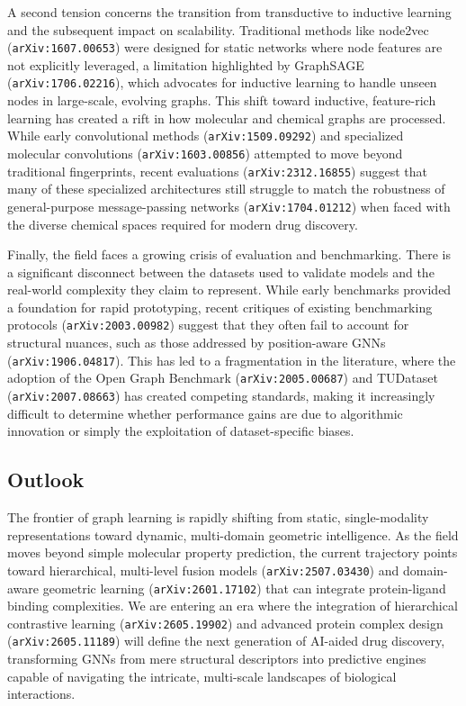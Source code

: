 \documentclass[11pt]{article}
\begin{document}
A second tension concerns the transition from transductive to inductive learning and the subsequent impact on scalability. Traditional methods like node2vec (\texttt{arXiv:1607.00653}) were designed for static networks where node features are not explicitly leveraged, a limitation highlighted by GraphSAGE (\texttt{arXiv:1706.02216}), which advocates for inductive learning to handle unseen nodes in large-scale, evolving graphs. This shift toward inductive, feature-rich learning has created a rift in how molecular and chemical graphs are processed. While early convolutional methods (\texttt{arXiv:1509.09292}) and specialized molecular convolutions (\texttt{arXiv:1603.00856}) attempted to move beyond traditional fingerprints, recent evaluations (\texttt{arXiv:2312.16855}) suggest that many of these specialized architectures still struggle to match the robustness of general-purpose message-passing networks (\texttt{arXiv:1704.01212}) when faced with the diverse chemical spaces required for modern drug discovery.

Finally, the field faces a growing crisis of evaluation and benchmarking. There is a significant disconnect between the datasets used to validate models and the real-world complexity they claim to represent. While early benchmarks provided a foundation for rapid prototyping, recent critiques of existing benchmarking protocols (\texttt{arXiv:2003.00982}) suggest that they often fail to account for structural nuances, such as those addressed by position-aware GNNs (\texttt{arXiv:1906.04817}). This has led to a fragmentation in the literature, where the adoption of the Open Graph Benchmark (\texttt{arXiv:2005.00687}) and TUDataset (\texttt{arXiv:2007.08663}) has created competing standards, making it increasingly difficult to determine whether performance gains are due to algorithmic innovation or simply the exploitation of dataset-specific biases.

\subsection{Outlook}

The frontier of graph learning is rapidly shifting from static, single-modality representations toward dynamic, multi-domain geometric intelligence. As the field moves beyond simple molecular property prediction, the current trajectory points toward hierarchical, multi-level fusion models (\texttt{arXiv:2507.03430}) and domain-aware geometric learning (\texttt{arXiv:2601.17102}) that can integrate protein-ligand binding complexities. We are entering an era where the integration of hierarchical contrastive learning (\texttt{arXiv:2605.19902}) and advanced protein complex design (\texttt{arXiv:2605.11189}) will define the next generation of AI-aided drug discovery, transforming GNNs from mere structural descriptors into predictive engines capable of navigating the intricate, multi-scale landscapes of biological interactions.
\end{document}
